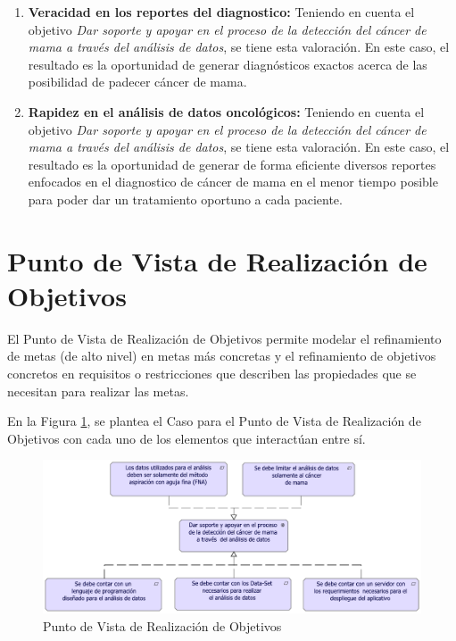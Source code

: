 \begin{enumerate}[label=\textbf{\arabic*})]
\item  \textbf{Veracidad en los reportes del diagnostico:} Teniendo en cuenta el objetivo \textit{Dar soporte y apoyar en el proceso de la detección del cáncer de mama a través del análisis de datos}, se tiene esta valoración. En este caso, el resultado es la oportunidad de generar diagnósticos exactos acerca de las posibilidad de padecer cáncer de mama.  

\item  \textbf{Rapidez en el análisis de datos oncológicos:} Teniendo en cuenta el objetivo \textit{Dar soporte y apoyar en el proceso de la detección del cáncer de mama a través del análisis de datos}, se tiene esta valoración. En este caso, el resultado es la oportunidad de generar de forma eficiente diversos reportes enfocados en el diagnostico de cáncer de mama en el menor tiempo posible para poder dar un tratamiento oportuno a cada paciente.
\end{enumerate}

\newpage
\section{Punto de Vista de Realización de Objetivos}
El Punto de Vista de Realización de Objetivos permite modelar el refinamiento de metas (de alto nivel) en metas más concretas y el refinamiento de objetivos concretos en requisitos o restricciones que describen las propiedades que se necesitan para realizar las metas\cite{BolanosCastro2019}. 

En la Figura \ref{PvRealizacionObj}, se plantea el Caso para el Punto de Vista de Realización de Objetivos con cada uno de los elementos que interactúan entre sí. 

\begin{figure}[h!]
	\centering
	\includegraphics[width=1\linewidth]{ARQUITECTURA/imgs/CapaMotivacion/2_PvRealizacionObj}
	\caption{Punto de Vista de Realización de Objetivos}
	\label{PvRealizacionObj}
\end{figure}

